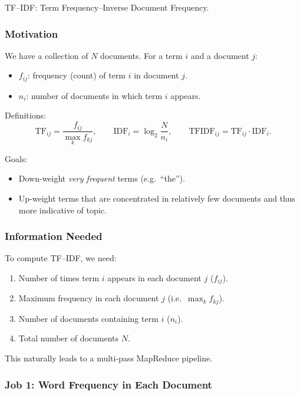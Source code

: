 \documentclass[11pt]{article}
\begin{document}
TF--IDF: Term Frequency--Inverse Document Frequency.

\subsubsection*{Motivation}

We have a collection of $N$ documents. For a term $i$ and a document $j$:
\begin{itemize}
    \item $f_{ij}$: frequency (count) of term $i$ in document $j$.
    \item $n_i$: number of documents in which term $i$ appears.
\end{itemize}

Definitions:
\[
    \text{TF}_{ij} = \frac{f_{ij}}{\max_k f_{kj}},\qquad
    \text{IDF}_i = \log_2 \frac{N}{n_i},\qquad
    \text{TFIDF}_{ij} = \text{TF}_{ij} \cdot \text{IDF}_i.
\]

Goals:\,
\begin{itemize}
    \item Down-weight \emph{very frequent} terms (e.g.\ ``the'').
    \item Up-weight terms that are concentrated in relatively few documents and thus more indicative of topic.
\end{itemize}

\subsubsection*{Information Needed}

To compute TF--IDF, we need:
\begin{enumerate}[label=(\arabic*)]
    \item Number of times term $i$ appears in each document $j$ ($f_{ij}$).
    \item Maximum frequency in each document $j$ (i.e.\ $\max_k f_{kj}$).
    \item Number of documents containing term $i$ ($n_i$).
    \item Total number of documents $N$.
\end{enumerate}

This naturally leads to a multi-pass MapReduce pipeline.

\subsubsection*{Job 1: Word Frequency in Each Document}
\end{document}
